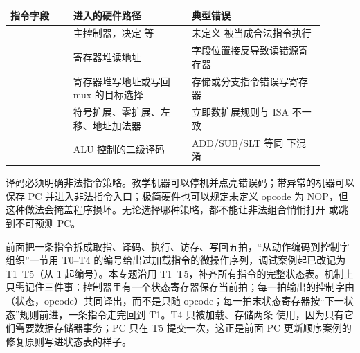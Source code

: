 \begin{longtable}{L{0.18\linewidth}L{0.34\linewidth}L{0.38\linewidth}}
\toprule
指令字段 & 进入的硬件路径 & 典型错误 \\
\midrule
{} & 主控制器，决定  等 & 未定义  被当成合法指令执行 \\\tablerowrule
{} & 寄存器堆读地址 & 字段位置接反导致读错源寄存器 \\\tablerowrule
{} & 寄存器堆写地址或写回 mux 的目标选择 & 存储或分支指令错误写寄存器 \\\tablerowrule
{} & 符号扩展、零扩展、左移、地址加法器 & 立即数扩展规则与 ISA 不一致 \\\tablerowrule
{} & ALU 控制的二级译码 & ADD/SUB/SLT 等同  下混淆 \\
\bottomrule
\end{longtable}

译码必须明确非法指令策略。教学机器可以停机并点亮错误码；带异常的机器可以保存 PC 并进入非法指令入口；极简硬件也可以规定未定义 opcode 为 NOP，但这种做法会掩盖程序损坏。无论选择哪种策略，都不能让非法组合悄悄打开  或跳到不可预测 PC。

前面把一条指令拆成取指、译码、执行、访存、写回五拍，“从动作编码到控制字组织”一节用 T0–T4 的编号给出过加载指令的微操作序列，调试案例起已改记为 T1–T5（从 1 起编号）。本专题沿用 T1–T5，补齐所有指令的完整状态表。机制上只需记住三件事：控制器里有一个状态寄存器保存当前拍；每一拍输出的控制字由（状态，opcode）共同译出，而不是只随 opcode；每一拍末状态寄存器按“下一状态”规则前进，一条指令走完回到 T1。T4 只被加载、存储两条  使用，因为只有它们需要数据存储器事务；PC 只在 T5 提交一次，这正是前面 PC 更新顺序案例的修复原则写进状态表的样子。

